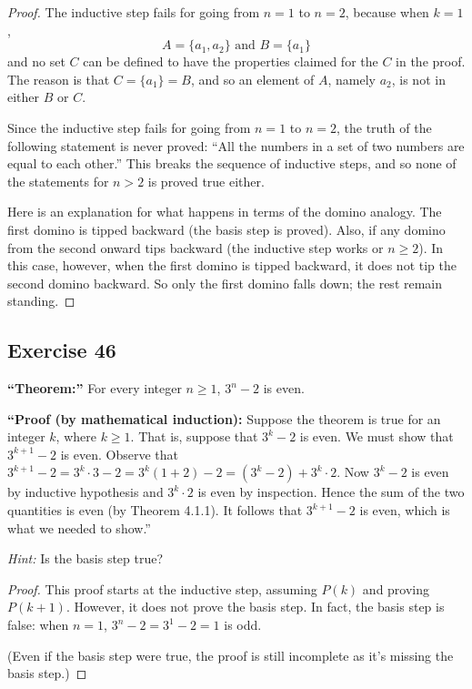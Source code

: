 \documentclass[14pt]{extarticle}
\begin{document}
\begin{proof}
    The inductive step fails for going from $n = 1$ to $n = 2$,
    because when $k = 1$,
    \[
        A = \{a_1, a_2\} \text{ and } B = \{a_1\}
    \]
    and no set $C$ can be defined to have the properties claimed for the $C$ in the proof. The reason is that $C = \{a_1\} = B$, and so an element of $A$, namely $a_2$, is
    not in either $B$ or $C$.

    Since the inductive step fails for going from $n = 1$ to $n = 2$, the truth of the following statement is never proved: “All the numbers in a set of two numbers are equal to each other.” This breaks the sequence of inductive steps, and so none of the statements for $n > 2$ is proved true either.

    Here is an explanation for what happens in terms of the
    domino analogy. The first domino is tipped backward (the basis step is proved). Also, if any domino from the second onward tips backward (the inductive step works or $n \geq 2$). In this case, however, when the first domino is tipped backward, it does not tip the second domino backward. So only the first domino falls down; the rest remain standing.
\end{proof}

\subsection{Exercise 46}
{\bf “Theorem:”} For every integer $n \geq 1$, $3^n - 2$ is even.

    {\bf “Proof (by mathematical induction):} Suppose the theorem is true for an integer $k$, where $k \geq 1$. That is, suppose that $3^k - 2$ is even. We must show that $3^{k+1} - 2$ is even. Observe that $3^{k+1} - 2 = 3^k \cdot 3 - 2 = 3^k(1 + 2) - 2 = (3^k - 2) + 3^k \cdot 2$. Now $3^k - 2$ is even by inductive hypothesis and $3^k \cdot 2$ is even by inspection. Hence the sum of the two quantities is even (by Theorem 4.1.1). It follows that $3^{k+1} - 2$ is even, which is what we needed to show.”

{\it Hint:} Is the basis step true?

\begin{proof}
    This proof starts at the inductive step, assuming $P(k)$ and proving $P(k+1)$. However, it does not prove the basis step. In fact, the basis step is false: when $n = 1$, $3^n - 2 = 3^1 - 2 = 1$ is odd.

    (Even if the basis step were true, the proof is still incomplete as it's missing the basis step.)
\end{proof}
\end{document}

